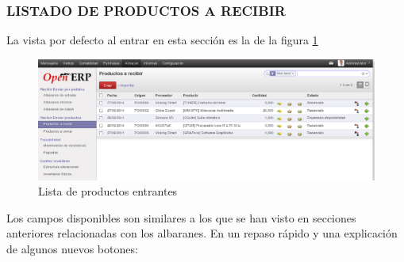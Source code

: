 \subsubsection{LISTADO DE PRODUCTOS A RECIBIR}

La vista por defecto al entrar en esta sección es la de la figura \ref{al:prodentrada}

\begin{figure}[H]
\includegraphics[width=\textwidth]{almacen/img/prod_entrada.png}
\caption{Lista de productos entrantes}
\label{al:prodentrada}
\end{figure}

Los campos disponibles son similares a los que se han visto en secciones anteriores relacionadas con los albaranes. En un repaso rápido y una explicación de algunos nuevos botones:

